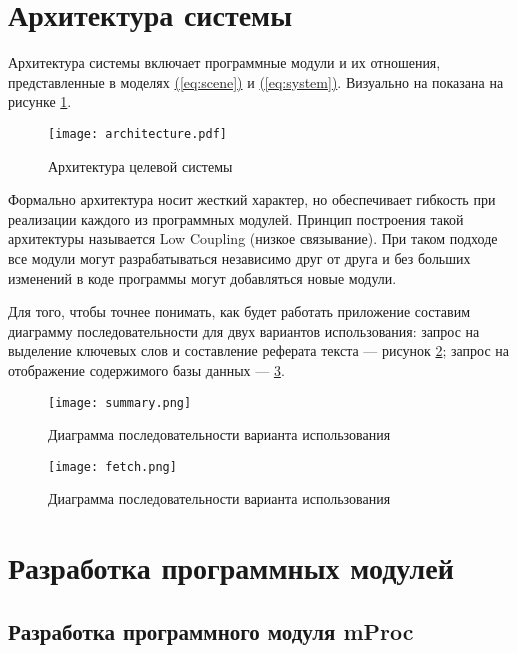 \section{Архитектура системы}

Архитектура системы включает программные модули и их отношения, представленные в моделях \hyperref[eq:scene]{(\ref{eq:scene})} и \hyperref[eq:system]{(\ref{eq:system})}. Визуально на показана на рисунке \hyperref[fig:arch]{\ref{fig:arch}}.

\begin{figure}[H]
\centering
\texttt{[image: architecture.pdf]}
\caption{Архитектура целевой системы}
\label{fig:arch}
\end{figure}

Формально архитектура носит жесткий характер, но обеспечивает гибкость при реализации каждого из программных модулей. Принцип построения такой архитектуры называется Low Coupling (низкое связывание). При таком подходе все модули могут разрабатываться независимо друг от друга и без больших изменений в коде программы могут добавляться новые модули.

Для того, чтобы точнее понимать, как будет работать приложение составим диаграмму последовательности для двух вариантов использования: запрос на выделение ключевых слов и составление реферата текста --- рисунок \hyperref[fig:extract]{\ref{fig:extract}}; запрос на отображение содержимого базы данных --- \hyperref[fig:fetch]{\ref{fig:fetch}}.

\begin{figure}[H]
\centering
\texttt{[image: summary.png]}
\caption{Диаграмма последовательности варианта использования }
\label{fig:extract}
\end{figure}

\begin{figure}[H]
\centering
\texttt{[image: fetch.png]}
\caption{Диаграмма последовательности варианта использования }
\label{fig:fetch}
\end{figure}

\section{Разработка программных модулей}

\subsection{Разработка программного модуля mProc}

